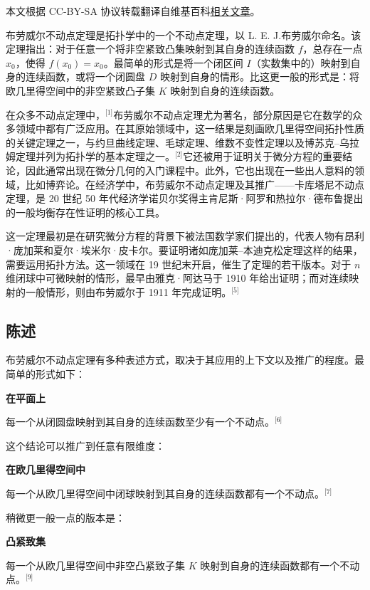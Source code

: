 
本文根据 CC-BY-SA 协议转载翻译自维基百科\href{https://en.wikipedia.org/wiki/Brouwer_fixed-point_theorem}{相关文章}。

布劳威尔不动点定理是拓扑学中的一个不动点定理，以 L. E. J.布劳威尔命名。该定理指出：对于任意一个将非空紧致凸集映射到其自身的连续函数 $f$，总存在一点 $x_0$，使得 $f(x_0) = x_0$。最简单的形式是将一个闭区间 $I$（实数集中的）映射到自身的连续函数，或将一个闭圆盘 $D$ 映射到自身的情形。比这更一般的形式是：将欧几里得空间中的非空紧致凸子集 $K$ 映射到自身的连续函数。

在众多不动点定理中，\(^\text{[1]}\)布劳威尔不动点定理尤为著名，部分原因是它在数学的众多领域中都有广泛应用。在其原始领域中，这一结果是刻画欧几里得空间拓扑性质的关键定理之一，与约旦曲线定理、毛球定理、维数不变性定理以及博苏克–乌拉姆定理并列为拓扑学的基本定理之一。\(^\text{[2]}\)它还被用于证明关于微分方程的重要结论，因此通常出现在微分几何的入门课程中。此外，它也出现在一些出人意料的领域，比如博弈论。在经济学中，布劳威尔不动点定理及其推广——卡库塔尼不动点定理，是 20 世纪 50 年代经济学诺贝尔奖得主肯尼斯·阿罗和热拉尔·德布鲁提出的一般均衡存在性证明的核心工具。

这一定理最初是在研究微分方程的背景下被法国数学家们提出的，代表人物有昂利·庞加莱和夏尔·埃米尔·皮卡尔。要证明诸如庞加莱–本迪克松定理这样的结果，需要运用拓扑方法。这一领域在 19 世纪末开启，催生了定理的若干版本。对于 $n$ 维闭球中可微映射的情形，最早由雅克·阿达马于 1910 年给出证明；而对连续映射的一般情形，则由布劳威尔于 1911 年完成证明。\(^\text{[5]}\)
\subsection{陈述}
布劳威尔不动点定理有多种表述方式，取决于其应用的上下文以及推广的程度。最简单的形式如下：

\textbf{在平面上}

每一个从闭圆盘映射到其自身的连续函数至少有一个不动点。\(^\text{[6]}\)

这个结论可以推广到任意有限维度：

\textbf{在欧几里得空间中}

每一个从欧几里得空间中闭球映射到其自身的连续函数都有一个不动点。\(^\text{[7]}\)

稍微更一般一点的版本是：

\textbf{凸紧致集}

每一个从欧几里得空间中非空凸紧致子集 $K$ 映射到自身的连续函数都有一个不动点。\(^\text{[9]}\)

